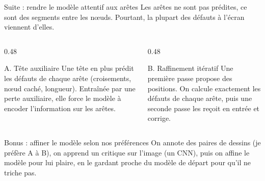 \documentclass[aspectratio=169,11pt]{beamer}
\begin{document}
\begin{frame}{Suite : rendre le modèle attentif aux arêtes}
\small Les arêtes ne sont pas prédites, ce sont des segments entre les nœuds. Pourtant, la plupart des défauts à l'écran viennent d'elles.

\vspace{0.3cm}
\begin{columns}[T]
\begin{column}{0.48\textwidth}
\begin{block}{A. Tête auxiliaire}
\small Une tête en plus prédit les défauts de chaque arête (croisements, nœud caché, longueur). Entraînée par une perte auxiliaire, elle force le modèle à encoder l'information sur les arêtes.
\end{block}
\end{column}
\begin{column}{0.48\textwidth}
\begin{block}{B. Raffinement itératif}
\small Une première passe propose des positions. On calcule exactement les défauts de chaque arête, puis une seconde passe les reçoit en entrée et corrige.
\end{block}
\end{column}
\end{columns}
\end{frame}

\begin{frame}{Bonus : affiner le modèle selon nos préférences}
\small On annote des paires de dessins (\og je préfère A à B\fg{}), on apprend un critique sur l'image (un CNN), puis on affine le modèle pour lui plaire, en le gardant proche du modèle de départ pour qu'il ne triche pas.

\vspace{0.4cm}
\centering
{}
\end{frame}


\end{document}
